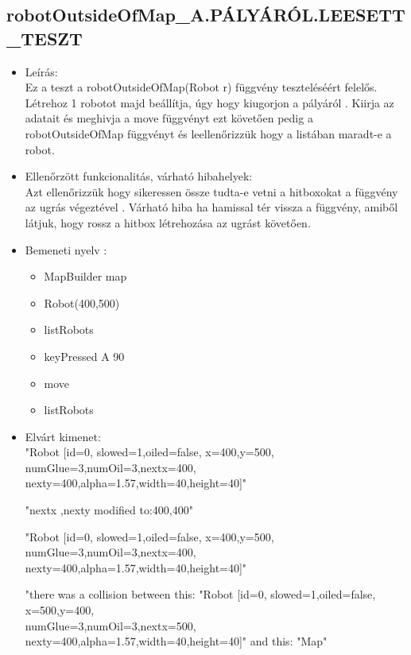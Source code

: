 \subsection{robotOutsideOfMap\_A.PÁLYÁRÓL.LEESETT\_TESZT}
\begin{itemize}
	\item Leírás: \\Ez a teszt a robotOutsideOfMap(Robot r) függvény teszteléséért felelős.
			Létrehoz 1 robotot majd beállítja, úgy hogy kiugorjon a pályáról .
			Kiirja az adatait  és meghivja a move függvényt ezt követően pedig a robotOutsideOfMap függvényt és leellenőrizzük hogy a listában maradt-e a robot.	\newline
	\item Ellenőrzött funkcionalitás, várható hibahelyek:\\
	Azt ellenőrizzük hogy sikeressen össze tudta-e vetni a hitboxokat a függvény az ugrás végeztével .
	Várható hiba ha hamissal tér vissza a függvény, amiből látjuk, hogy rossz a hitbox létrehozása  az ugrást követően.
	\item Bemeneti nyelv :
		\begin{itemize}
\item MapBuilder map
		\item Robot(400,500)
		\item listRobots
		\item keyPressed A 90
		\item move
		\item listRobots
		\end{itemize}

	\item Elvárt kimenet: \\
		"Robot [id=0,  slowed=1,oiled=false, x=400,y=500, 
		\\numGlue=3,numOil=3,nextx=400,
		\\nexty=400,alpha=1.57,width=40,height=40]"\newline
		
		"nextx ,nexty modified to:400,400"\newline
	
		"Robot [id=0,  slowed=1,oiled=false, x=400,y=500, 
		\\numGlue=3,numOil=3,nextx=400,
		\\nexty=400,alpha=1.57,width=40,height=40]"\newline
		 
		 "there was a collision between this: "Robot [id=0,  slowed=1,oiled=false, x=500,y=400, 
		\\numGlue=3,numOil=3,nextx=500,
		\\nexty=400,alpha=1.57,width=40,height=40]"\newline
		and this:
		"Map"\newline
\end{itemize}

